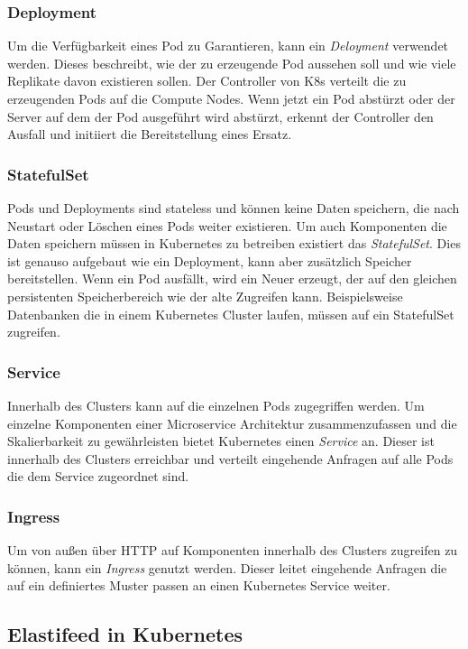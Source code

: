 \subsubsection{Deployment}
Um die Verfügbarkeit eines Pod zu Garantieren, kann ein \textit{Deloyment} verwendet werden.
Dieses beschreibt, wie der zu erzeugende Pod aussehen soll und wie viele Replikate davon existieren sollen.
Der Controller von K8s verteilt die zu erzeugenden Pods auf die Compute Nodes.
Wenn jetzt ein Pod abstürzt oder der Server auf dem der Pod ausgeführt wird abstürzt, erkennt der Controller den Ausfall und initiiert die Bereitstellung eines Ersatz.

\subsubsection{StatefulSet}
Pods und Deployments sind stateless und können keine Daten speichern, die nach Neustart oder Löschen eines Pods weiter existieren.
Um auch Komponenten die Daten speichern müssen in Kubernetes zu betreiben existiert das \textit{StatefulSet}.
Dies ist genauso aufgebaut wie ein Deployment, kann aber zusätzlich Speicher bereitstellen.
Wenn ein Pod ausfällt, wird ein Neuer erzeugt, der auf den gleichen persistenten Speicherbereich wie der alte Zugreifen kann.
Beispielsweise Datenbanken die in einem Kubernetes Cluster laufen, müssen auf ein StatefulSet zugreifen.

\subsubsection{Service}
Innerhalb des Clusters kann auf die einzelnen Pods zugegriffen werden.
Um einzelne Komponenten einer Microservice Architektur zusammenzufassen und die Skalierbarkeit zu gewährleisten bietet Kubernetes einen \textit{Service} an.
Dieser ist innerhalb des Clusters erreichbar und verteilt eingehende Anfragen auf alle Pods die dem Service zugeordnet sind.

\subsubsection{Ingress}
Um von außen über HTTP auf Komponenten innerhalb des Clusters zugreifen zu können, kann ein \textit{Ingress} genutzt werden.
Dieser leitet eingehende Anfragen die auf ein definiertes Muster passen an einen Kubernetes Service weiter.
\endsubsection



\subsection{Elastifeed in Kubernetes}


